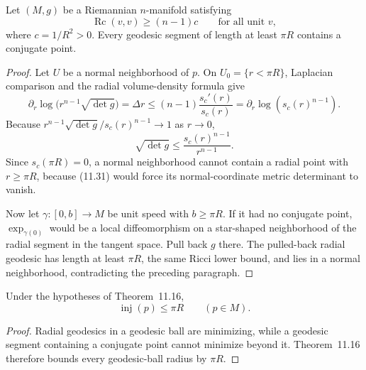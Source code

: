 \begin{theorem}
\label{thm:conjugate-points-ricci-bounded}


Let $(M,g)$ be a Riemannian $n$-manifold satisfying
\[
\operatorname{Rc}(v,v)\geq(n-1)c
\qquad\text{for all unit }v,
\]
where $c=1/R^2>0$. Every geodesic segment of length at least $\pi R$
contains a conjugate point.

\begin{proof}
\sketch Let $U$ be a normal neighborhood of $p$. On
$U_0=\{r<\pi R\}$, Laplacian comparison and the radial volume-density formula
give
\[
\partial_r\log\bigl(r^{n-1}\sqrt{\det g}\bigr)
=\Delta r
\leq(n-1)\frac{s_c'(r)}{s_c(r)}
=\partial_r\log(s_c(r)^{n-1}).
\]
Because
$r^{n-1}\sqrt{\det g}/s_c(r)^{n-1}\to1$ as $r\to0$,
\begin{equation}
\sqrt{\det g}\leq\frac{s_c(r)^{n-1}}{r^{n-1}}.
\tag{11.31}
\end{equation}
Since $s_c(\pi R)=0$, a normal neighborhood cannot contain a radial point
with $r\geq\pi R$, because (11.31) would force its normal-coordinate metric
determinant to vanish.

Now let $\gamma:[0,b]\to M$ be unit speed with $b\geq\pi R$. If it had no
conjugate point, $\exp_{\gamma(0)}$ would be a local diffeomorphism on a
star-shaped neighborhood of the radial segment in the tangent space. Pull
back $g$ there. The pulled-back radial geodesic has length at least $\pi R$,
the same Ricci lower bound, and lies in a normal neighborhood, contradicting
the preceding paragraph.
\end{proof}
\end{theorem}

\begin{corollary}
\label{cor:injectivity-radius-ricci-bounded}


Under the hypotheses of Theorem~11.16,
\[
\operatorname{inj}(p)\leq\pi R
\qquad(p\in M).
\]

\begin{proof}
\sketch Radial geodesics in a geodesic ball are minimizing, while a geodesic
segment containing a conjugate point cannot minimize beyond it. Theorem~11.16
therefore bounds every geodesic-ball radius by $\pi R$.
\end{proof}
\end{corollary}

